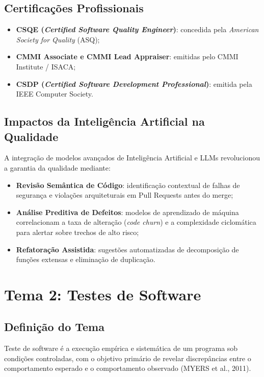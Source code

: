 \documentclass[12pt,a4paper]{article}
\begin{document}
\subsection{Certificações Profissionais}
\begin{itemize}
    \item \textbf{CSQE (\textit{Certified Software Quality Engineer})}: concedida pela \textit{American Society for Quality} (ASQ);
    \item \textbf{CMMI Associate e CMMI Lead Appraiser}: emitidas pelo CMMI Institute / ISACA;
    \item \textbf{CSDP (\textit{Certified Software Development Professional})}: emitida pela IEEE Computer Society.
\end{itemize}

\subsection{Impactos da Inteligência Artificial na Qualidade}
A integração de modelos avançados de Inteligência Artificial e LLMs revolucionou a garantia da qualidade mediante:
\begin{itemize}
    \item \textbf{Revisão Semântica de Código}: identificação contextual de falhas de segurança e violações arquiteturais em Pull Requests antes do merge;
    \item \textbf{Análise Preditiva de Defeitos}: modelos de aprendizado de máquina correlacionam a taxa de alteração (\textit{code churn}) e a complexidade ciclomática para alertar sobre trechos de alto risco;
    \item \textbf{Refatoração Assistida}: sugestões automatizadas de decomposição de funções extensas e eliminação de duplicação.
\end{itemize}

\section{Tema 2: Testes de Software}

\subsection{Definição do Tema}
Teste de software é a execução empírica e sistemática de um programa sob condições controladas, com o objetivo primário de revelar discrepâncias entre o comportamento esperado e o comportamento observado (MYERS et al., 2011).
\end{document}
